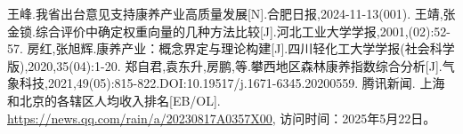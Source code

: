 \documentclass[12pt,a4paper]{article}
\begin{document}
\newpage
\begin{thebibliography}{99}
         王峰.我省出台意见支持康养产业高质量发展[N].合肥日报,2024-11-13(001).
         王靖,张金锁.综合评价中确定权重向量的几种方法比较[J].河北工业大学学报,2001,(02):52-57.
         房红,张旭辉.康养产业：概念界定与理论构建[J].四川轻化工大学学报(社会科学版),2020,35(04):1-20.
         郑自君,袁东升,房鹏,等.攀西地区森林康养指数综合分析[J].气象科技,2021,49(05):815-822.DOI:10.19517/j.1671-6345.20200559.
         腾讯新闻. 上海和北京的各辖区人均收入排名[EB/OL]. \url{https://news.qq.com/rain/a/20230817A0357X00}, 访问时间：2025年5月22日。

\end{thebibliography}
\end{document}
